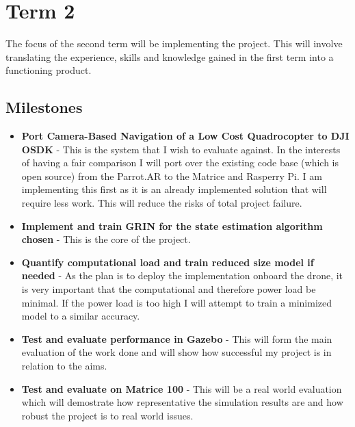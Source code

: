 \documentclass[]{../resources/final_report}
\begin{document}
\section{Term 2}

The focus of the second term will be implementing the project. This will involve translating the experience, skills and knowledge gained in the first term into a functioning product.

\subsection{Milestones}
\begin{itemize}
  \item \textbf{Port Camera-Based Navigation of a Low Cost Quadrocopter to DJI OSDK} - This is the system that I wish to evaluate against. In the interests of having a fair comparison I will port over the existing code base (which is open source) from the Parrot.AR to the Matrice and Rasperry Pi. I am implementing this first as it is an already implemented solution that will require less work. This will reduce the risks of total project failure.
  \item \textbf{Implement and train GRIN for the state estimation algorithm chosen} - This is the core of the project.
  \item \textbf{Quantify computational load and train reduced size model if needed} - As the plan is to deploy the implementation onboard the drone, it is very important that the computational and therefore power load be minimal. If the power load is too high I will attempt to train a minimized model to a similar accuracy.
  \item \textbf{Test and evaluate performance in Gazebo} - This will form the main evaluation of the work done and will show how successful my project is in relation to the aims.
  \item \textbf{Test and evaluate on Matrice 100} - This will be a real world evaluation which will demostrate how representative the simulation results are and how robust the project is to real world issues.
\end{itemize}
\end{document}
